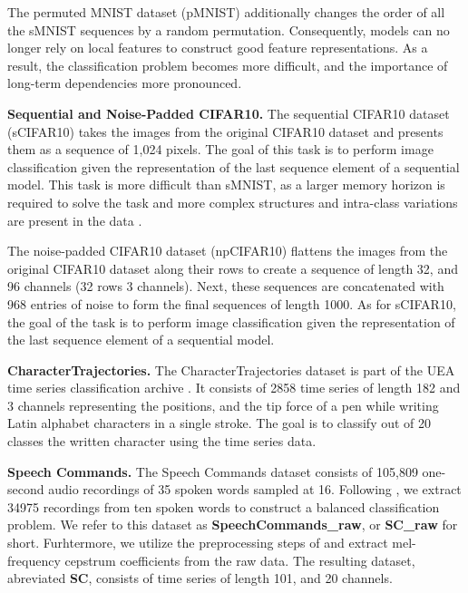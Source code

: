 \documentclass{article} \usepackage{iclr2022_conference,times}
\begin{document}
The permuted MNIST dataset (pMNIST) additionally changes the order of all the sMNIST sequences by a random permutation. Consequently, models can no longer rely on local features to construct good feature representations. As a result, the classification problem becomes more difficult, and the importance of long-term dependencies more pronounced.

\textbf{Sequential and Noise-Padded CIFAR10.} The sequential CIFAR10 dataset (sCIFAR10) \citep{chang2017dilated} takes the  images from the original CIFAR10 dataset \citep{krizhevsky2009learning} and presents them as a sequence of 1,024 pixels. The goal of this task is to perform image classification given the representation of the last sequence element of a sequential model. This task is more difficult than sMNIST, as a larger memory horizon is required to solve the task and more complex structures and intra-class variations are present in the data \citep{bai2018trellis}. 

The noise-padded CIFAR10 dataset (npCIFAR10) \citep{chang2019antisymmetricrnn} flattens the images from the original CIFAR10 dataset \citep{krizhevsky2009learning} along their rows to create a sequence of length 32, and 96 channels (32 rows  3 channels). Next, these sequences are concatenated with 968 entries of noise to form the final sequences of length 1000. As for sCIFAR10, the goal of the task is to perform image classification given the representation of the last sequence element of a sequential model. 

\textbf{CharacterTrajectories.} The CharacterTrajectories dataset is part of the UEA time series classification archive \citep{bagnall2018uea}. It consists of 2858 time series of length 182 and 3 channels representing the  positions, and the tip force of a pen while writing Latin alphabet characters in a single stroke. The goal is to classify out of 20 classes the written character using the time series data. 

\textbf{Speech Commands.} The Speech Commands dataset \citep{warden2018speech} consists of 105,809 one-second audio recordings of 35 spoken words sampled at 16. Following \citet{kidger2020neural}, we extract 34975 recordings from ten spoken words to construct a balanced classification problem. We refer to this dataset as \textbf{SpeechCommands\_raw}, or \textbf{SC\_raw} for short. Furhtermore, we utilize the preprocessing steps of \citet{kidger2020neural} and extract mel-frequency cepstrum coefficients from the raw data. The resulting dataset, abreviated \textbf{SC}, consists of time series of length 101, and 20 channels.
\end{document}
